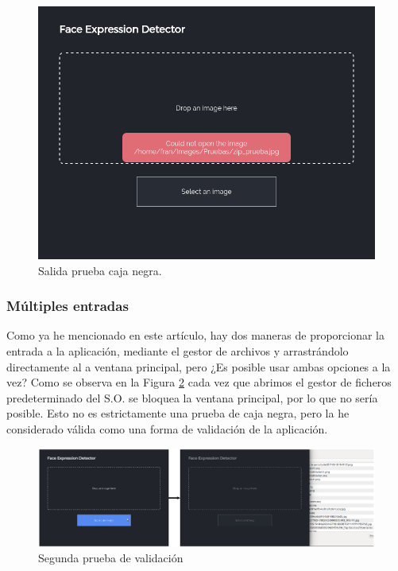 \documentclass[a4paper,11pt]{book}
\begin{document}
\begin{figure}[h]
\centering
\includegraphics[width=0.7\linewidth]{imagenes/validation02}
\caption[Salida prueba caja negra.]{Salida prueba caja negra.}
\label{fig:validation02}
\end{figure}

\subsubsection{Múltiples entradas}
Como ya he mencionado en este artículo, hay dos maneras de proporcionar la entrada a la aplicación, mediante el gestor de archivos y arrastrándolo directamente al a ventana principal, pero ¿Es posible usar ambas opciones a la vez? Como se observa en la Figura \ref{fig:validacion03} cada vez que abrimos el gestor de ficheros predeterminado del S.O. se bloquea la ventana principal, por lo que no sería posible. Esto no es estrictamente una prueba de caja negra, pero la he considerado válida como una forma de validación de la aplicación.\\

\begin{figure}[h]
\centering
\includegraphics[width=1.0\linewidth]{imagenes/validacion03}
\caption[Segunda prueba de validación]{Segunda prueba de validación}
\label{fig:validacion03}
\end{figure}
\end{document}
